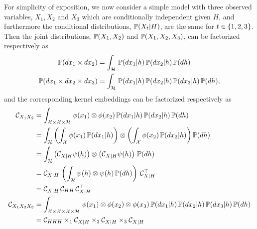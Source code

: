 \documentclass[11pt]{article}
\begin{document}
For simplicity of exposition, we now consider a simple model with three observed variables, $X_1, X_2$ and $X_3$ which are conditionally independent given $H$, and furthermore the conditional distributions, $\mathbb{P}(X_t|H)$, are the same for $t \in \left\{1,2,3\right\}$. Then the joint distributions, $\mathbb{P}(X_1,X_2)$ and $\mathbb{P}(X_1,X_2,X_3)$, can be factorized respectively as 
\begin{align} 
 \mathbb{P}(dx_1 \times dx_2) &= \int_{\mathcal{H}}\, \mathbb{P}(dx_1 | h )\, \mathbb{P}(d x_2 | h)\, \mathbb{P}(dh) \\
  \mathbb{P}(dx_1 \times dx_2\times dx_3) &= \int_{\mathcal{H}}\, \mathbb{P}(dx_1 | h )\, \mathbb{P}(dx_2 | h)\, \mathbb{P}(dx_3 | h)\, \mathbb{P}(dh),   
\end{align}
and the corresponding kernel embeddings can be factorized respectively as 
\begin{align} 
  \mathcal{C}_{X_1X_2} 
  &= \int_{\mathcal{X}\times \mathcal{X} \times \mathcal{H}}\, \phi(x_1) \otimes \phi(x_2)\, \mathbb{P}(dx_1 | h )\, \mathbb{P}(dx_2 | h)\, \mathbb{P}(dh) \\
  &= \int_{\mathcal{H}} \left(\int_{\mathcal{X}} \phi(x_1)\, \mathbb{P}(dx_1|h)\right) \otimes \left(\int_{\mathcal{X}} \phi(x_2)\, \mathbb{P}(dx_2 |h)\right) \mathbb{P}(dh) \\
  &= \int_{\mathcal{H}} \left(\mathcal{C}_{X|H} \psi(h)\right) \otimes \left(\mathcal{C}_{X|H} \psi(h)\right)\, \mathbb{P}(dh) \\
  &= \mathcal{C}_{X|H}\, \left(\int_{\mathcal{H}} \psi(h) \otimes \psi(h)\, \mathbb{P}(dh)\right)\, \mathcal{C}_{X|H}^\top\\
  &= \mathcal{C}_{X|H}\, \mathcal{C}_{HH}\, \mathcal{C}_{X|H}^\top \\
  \mathcal{C}_{X_1 X_2 X_3}  
  &= \int_{\mathcal{X}\times \mathcal{X} \times \mathcal{X} \times \mathcal{H}}\, \phi(x_1) \otimes \phi(x_2) \otimes \phi(x_3) \, \mathbb{P}(dx_1 | h )\, \mathbb{P}(dx_2 | h)\, \mathbb{P}(dx_3 | h)\,  \mathbb{P}(dh) \\
  &= \mathcal{C}_{HHH} \times_1 \mathcal{C}_{X|H} \times_2 \mathcal{C}_{X|H} \times_3 \mathcal{C}_{X|H}
\end{align}
\end{document}
